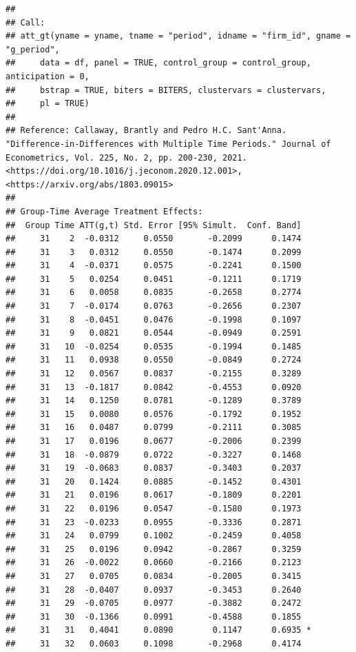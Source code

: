 \documentclass[
]{article}
\begin{document}
\begin{verbatim}
## 
## Call:
## att_gt(yname = yname, tname = "period", idname = "firm_id", gname = "g_period", 
##     data = df, panel = TRUE, control_group = control_group, anticipation = 0, 
##     bstrap = TRUE, biters = BITERS, clustervars = clustervars, 
##     pl = TRUE)
## 
## Reference: Callaway, Brantly and Pedro H.C. Sant'Anna.  "Difference-in-Differences with Multiple Time Periods." Journal of Econometrics, Vol. 225, No. 2, pp. 200-230, 2021. <https://doi.org/10.1016/j.jeconom.2020.12.001>, <https://arxiv.org/abs/1803.09015> 
## 
## Group-Time Average Treatment Effects:
##  Group Time ATT(g,t) Std. Error [95% Simult.  Conf. Band]  
##     31    2  -0.0312     0.0550       -0.2099      0.1474  
##     31    3   0.0312     0.0550       -0.1474      0.2099  
##     31    4  -0.0371     0.0575       -0.2241      0.1500  
##     31    5   0.0254     0.0451       -0.1211      0.1719  
##     31    6   0.0058     0.0835       -0.2658      0.2774  
##     31    7  -0.0174     0.0763       -0.2656      0.2307  
##     31    8  -0.0451     0.0476       -0.1998      0.1097  
##     31    9   0.0821     0.0544       -0.0949      0.2591  
##     31   10  -0.0254     0.0535       -0.1994      0.1485  
##     31   11   0.0938     0.0550       -0.0849      0.2724  
##     31   12   0.0567     0.0837       -0.2155      0.3289  
##     31   13  -0.1817     0.0842       -0.4553      0.0920  
##     31   14   0.1250     0.0781       -0.1289      0.3789  
##     31   15   0.0080     0.0576       -0.1792      0.1952  
##     31   16   0.0487     0.0799       -0.2111      0.3085  
##     31   17   0.0196     0.0677       -0.2006      0.2399  
##     31   18  -0.0879     0.0722       -0.3227      0.1468  
##     31   19  -0.0683     0.0837       -0.3403      0.2037  
##     31   20   0.1424     0.0885       -0.1452      0.4301  
##     31   21   0.0196     0.0617       -0.1809      0.2201  
##     31   22   0.0196     0.0547       -0.1580      0.1973  
##     31   23  -0.0233     0.0955       -0.3336      0.2871  
##     31   24   0.0799     0.1002       -0.2459      0.4058  
##     31   25   0.0196     0.0942       -0.2867      0.3259  
##     31   26  -0.0022     0.0660       -0.2166      0.2123  
##     31   27   0.0705     0.0834       -0.2005      0.3415  
##     31   28  -0.0407     0.0937       -0.3453      0.2640  
##     31   29  -0.0705     0.0977       -0.3882      0.2472  
##     31   30  -0.1366     0.0991       -0.4588      0.1855  
##     31   31   0.4041     0.0890        0.1147      0.6935 *
##     31   32   0.0603     0.1098       -0.2968      0.4174  

\end{verbatim}
\end{document}
